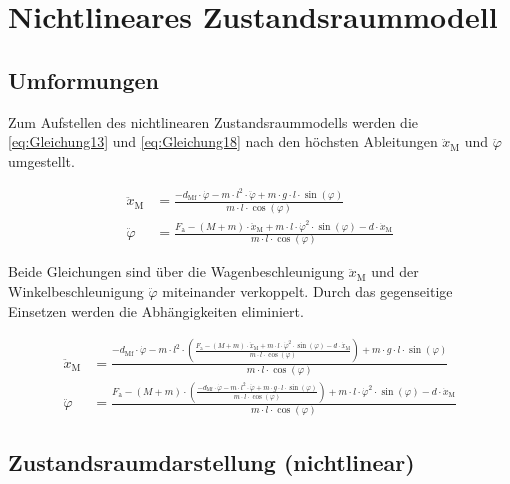 \section{Nichtlineares Zustandsraummodell}

\subsection{Umformungen}

Zum Aufstellen des nichtlinearen Zustandsraummodells werden die \autoref{eq:Gleichung13} und \autoref{eq:Gleichung18} nach den höchsten Ableitungen $\ddot x_{\mathrm{M}}$ und $\ddot \varphi$ umgestellt.

\begin{align}
    \ddot x_{\mathrm{M}} &= \frac{-d_{\mathrm{Mf}} \cdot \dot \varphi -m \cdot l^2 \cdot \ddot \varphi + m \cdot g \cdot l \cdot \sin({\varphi})}{m \cdot l \cdot \cos({\varphi})} \label{eq:Gleichung19} \\
    \ddot \varphi &= \frac{F_{\mathrm{a}} - (M+m) \cdot \ddot x_{\mathrm{M}} + m \cdot l \cdot \dot \varphi^2 \cdot \sin({\varphi}) -d \cdot \dot x_{\mathrm{M}}}{m \cdot l \cdot \cos({\varphi})} \label{eq:Gleichung20}
\end{align}

Beide Gleichungen sind über die Wagenbeschleunigung $\ddot x_{\mathrm{M}}$ und der Winkelbeschleunigung $\ddot \varphi$ miteinander verkoppelt. Durch das gegenseitige Einsetzen werden die Abhängigkeiten eliminiert.

\begin{align}
    \ddot x_{\mathrm{M}} &= \frac{-d_{\mathrm{Mf}} \cdot \dot \varphi -m \cdot l^2 \cdot \left( \frac{F_{\mathrm{a}} - (M+m) \cdot \ddot x_{\mathrm{M}} + m \cdot l \cdot \dot \varphi^2 \cdot \sin({\varphi}) -d \cdot \dot x_{\mathrm{M}}}{m \cdot l \cdot \cos({\varphi})} \right) + m \cdot g \cdot l \cdot \sin({\varphi})}{m \cdot l \cdot \cos({\varphi})} \label{eq:Gleichung21} \\
    \ddot \varphi &= \frac{F_{\mathrm{a}} - (M+m) \cdot \left( \frac{-d_{\mathrm{Mf}} \cdot \dot \varphi -m \cdot l^2 \cdot \ddot \varphi + m \cdot g \cdot l \cdot \sin({\varphi})}{m \cdot l \cdot \cos({\varphi})} \right) + m \cdot l \cdot \dot \varphi^2 \cdot \sin({\varphi}) -d \cdot \dot x_{\mathrm{M}}}{m \cdot l \cdot \cos({\varphi})} \label{eq:Gleichung22}
\end{align}

\subsection{Zustandsraumdarstellung (nichtlinear)}

